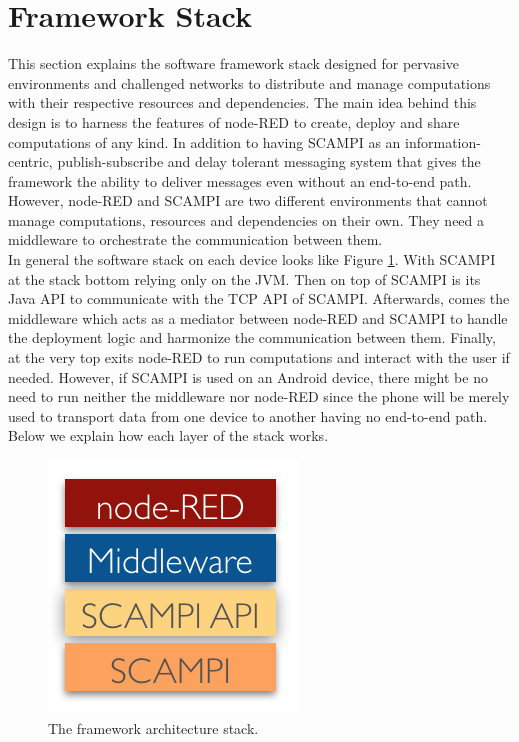 \section{Framework Stack}\label{sec:design}
This section explains the software framework stack designed for pervasive environments and challenged networks to distribute and manage computations with their respective resources and dependencies.  The main idea behind this design is to harness the features of node-RED to create, deploy and share computations of any kind. In addition to having SCAMPI as an information-centric, publish-subscribe and delay tolerant messaging system that gives the framework the ability to deliver messages even without an end-to-end path. However, node-RED and SCAMPI are two different environments that cannot manage computations, resources and dependencies on their own. They need a middleware to orchestrate the communication between them.\\


\noindent In general the software stack on each device  looks like Figure \ref{fig:stack}. With SCAMPI at the stack bottom relying only on the JVM. Then on top of SCAMPI is its Java API to communicate with the TCP API of SCAMPI. Afterwards, comes the middleware which acts as a mediator between node-RED and SCAMPI to handle the deployment logic and harmonize the communication between them. Finally, at the very top exits node-RED to run computations and interact with the user if needed. However, if SCAMPI is used on an Android device, there might be no need to run neither the middleware nor node-RED since the phone will be  merely used to transport data from one device to another having no end-to-end path. Below we explain how each layer  of the stack works.
\begin{figure}[H]
	\centering
	\includegraphics[scale=0.8]{images/stack.png}
	\caption{The framework architecture stack.  }
	\label{fig:stack}
\end{figure}



